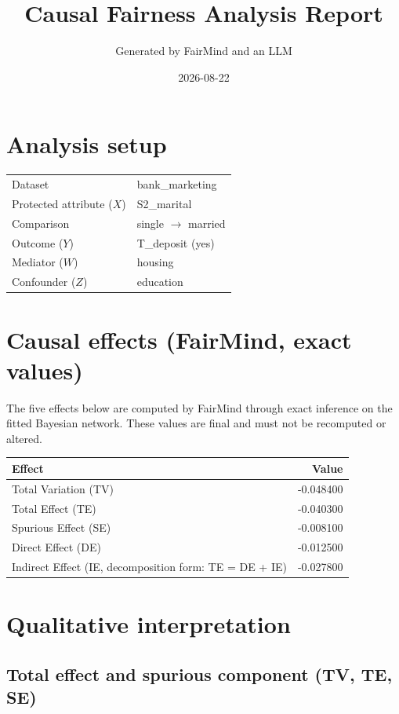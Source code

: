 \documentclass[11pt]{article}
\title{Causal Fairness Analysis Report}
\author{Generated by FairMind and an LLM}
\date{2026-08-22}
\begin{document}
\maketitle

\section{Analysis setup}

\begin{tabular}{ll}
\toprule
Dataset & bank\_marketing \\
Protected attribute ($X$) & S2\_marital \\
Comparison & single $\to$ married \\
Outcome ($Y$) & T\_deposit (yes) \\
Mediator ($W$) & housing \\
Confounder ($Z$) & education \\
\bottomrule
\end{tabular}

\section{Causal effects (FairMind, exact values)}

The five effects below are computed by FairMind through exact inference on the
fitted Bayesian network. These values are final and must not be recomputed or
altered.

\begin{tabular}{lr}
\toprule
Effect & Value \\
\midrule
Total Variation (TV) & -0.048400 \\
Total Effect (TE) & -0.040300 \\
Spurious Effect (SE) & -0.008100 \\
Direct Effect (DE) & -0.012500 \\
Indirect Effect (IE, decomposition form: TE = DE + IE) & -0.027800 \\
\bottomrule
\end{tabular}

\section{Qualitative interpretation}

\subsection{Total effect and spurious component (TV, TE, SE)}
\end{document}
